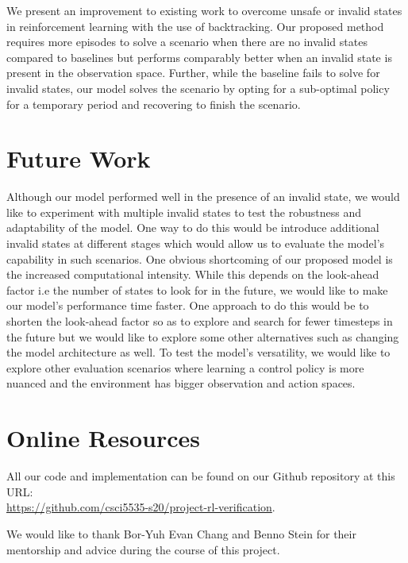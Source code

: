 \documentclass[acmsmall,review,authorversion]{acmart}
\begin{document}
We present an improvement to existing work to overcome unsafe or invalid states in reinforcement learning with the use of backtracking. Our proposed method requires more episodes to solve a scenario when there are no invalid states compared to baselines but performs comparably better when an invalid state is present in the observation space. Further, while the baseline fails to solve for invalid states, our model solves the scenario by opting for a sub-optimal policy for a temporary period and recovering to finish the scenario.


\section{Future Work}
\label{section:future_work}

Although our model performed well in the presence of an invalid state, we would like to experiment with multiple invalid states to test the robustness and adaptability of the model. One way to do this would be introduce additional invalid states at different stages which would allow us to evaluate the model's capability in such scenarios. One obvious shortcoming of our proposed model is the increased computational intensity. While this depends on the look-ahead factor i.e the number of states to look for in the future, we would like to make our model's performance time faster. One approach to do this would be to shorten the look-ahead factor so as to explore and search for fewer timesteps in the future but we would like to explore some other alternatives such as changing the model architecture as well. To test the model's versatility, we would like to explore other evaluation scenarios where learning a control policy is more nuanced and the environment has bigger observation and action spaces. 

\section{Online Resources}
\label{section:online_resources}
All our code and implementation can be found on our Github repository at this URL: \\ 
\url{https://github.com/csci5535-s20/project-rl-verification}.


\begin{acks}
We would like to thank Bor-Yuh Evan Chang and Benno Stein for their mentorship and advice during the course of this project.
\end{acks}



\end{document}
